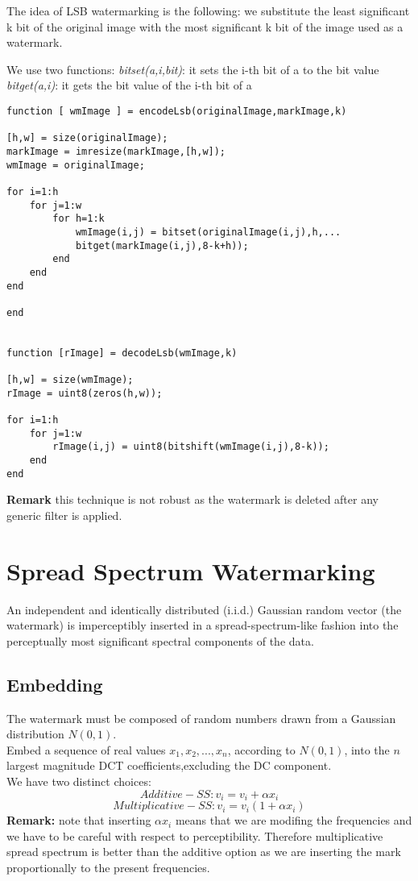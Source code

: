 \documentclass[10pt,a4paper]{book}
\begin{document}
The idea of LSB watermarking is the following: we substitute the least significant k bit of the original image with the most significant k bit of the image used as a watermark.

We use two functions:
\emph{bitset(a,i,bit)}: it sets the i-th bit of a to the bit value\\
\emph{bitget(a,i)}: it gets the bit value of the i-th bit of a\\

\begin{verbatim}
function [ wmImage ] = encodeLsb(originalImage,markImage,k)

[h,w] = size(originalImage);
markImage = imresize(markImage,[h,w]);
wmImage = originalImage;

for i=1:h
    for j=1:w
        for h=1:k
            wmImage(i,j) = bitset(originalImage(i,j),h,...
            bitget(markImage(i,j),8-k+h));
        end
    end
end

end


function [rImage] = decodeLsb(wmImage,k)

[h,w] = size(wmImage);
rImage = uint8(zeros(h,w));

for i=1:h
    for j=1:w
        rImage(i,j) = uint8(bitshift(wmImage(i,j),8-k));
    end
end
\end{verbatim}

\textbf{Remark} this technique is not robust as the watermark is deleted after any generic filter is applied.
\newpage
\section{Spread Spectrum Watermarking}

An independent and identically distributed (i.i.d.) Gaussian random vector (the watermark) is imperceptibly inserted in a spread-spectrum-like fashion into the perceptually most significant spectral components of the data.\\
\subsection{Embedding}
The watermark must be composed of random numbers drawn from a Gaussian distribution $N(0,1)$.\\
Embed a sequence of real values $x_1,x_2,..., x_n$, according to $N(0,1)$, into the $n$ largest magnitude DCT coefficients,excluding the DC component.\\
We have two distinct choices:\\
$$ Additive-SS: v_i = v_i + \alpha x_i $$
$$ Multiplicative-SS: v_i=v_i(1+\alpha x_i)$$
\textbf{Remark:} note that inserting $\alpha x_i$ means that we are modifing the frequencies and we have to be careful with respect to perceptibility. Therefore multiplicative spread spectrum is better than the additive option as we are inserting the mark proportionally to the present frequencies.
\end{document}
